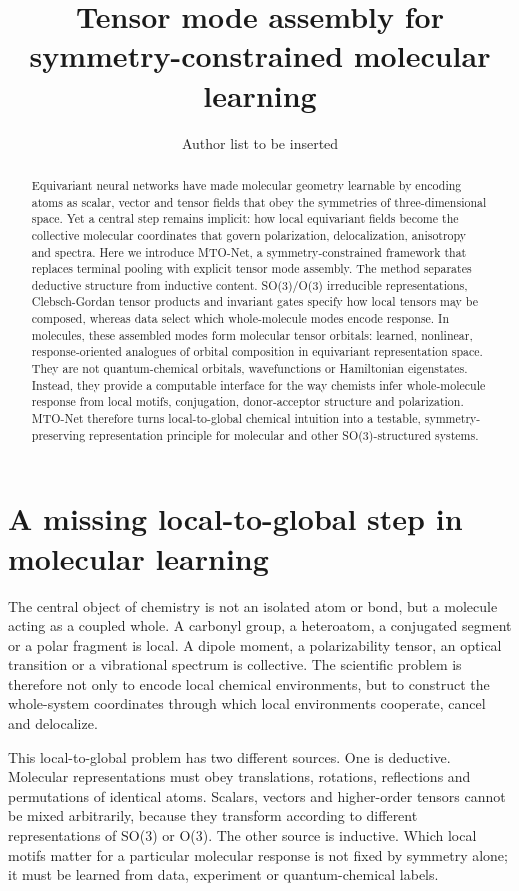 \documentclass[11pt]{article}
\title{\bfseries Tensor mode assembly for symmetry-constrained molecular learning}
\author{Author list to be inserted}
\date{}
\begin{document}
\maketitle

\begin{abstract}
Equivariant neural networks have made molecular geometry learnable by encoding atoms as scalar, vector and tensor fields that obey the symmetries of three-dimensional space. Yet a central step remains implicit: how local equivariant fields become the collective molecular coordinates that govern polarization, delocalization, anisotropy and spectra. Here we introduce MTO-Net, a symmetry-constrained framework that replaces terminal pooling with explicit tensor mode assembly. The method separates deductive structure from inductive content. SO(3)/O(3) irreducible representations, Clebsch-Gordan tensor products and invariant gates specify how local tensors may be composed, whereas data select which whole-molecule modes encode response. In molecules, these assembled modes form molecular tensor orbitals: learned, nonlinear, response-oriented analogues of orbital composition in equivariant representation space. They are not quantum-chemical orbitals, wavefunctions or Hamiltonian eigenstates. Instead, they provide a computable interface for the way chemists infer whole-molecule response from local motifs, conjugation, donor-acceptor structure and polarization. MTO-Net therefore turns local-to-global chemical intuition into a testable, symmetry-preserving representation principle for molecular and other SO(3)-structured systems.
\end{abstract}

\section*{A missing local-to-global step in molecular learning}

The central object of chemistry is not an isolated atom or bond, but a molecule acting as a coupled whole. A carbonyl group, a heteroatom, a conjugated segment or a polar fragment is local. A dipole moment, a polarizability tensor, an optical transition or a vibrational spectrum is collective. The scientific problem is therefore not only to encode local chemical environments, but to construct the whole-system coordinates through which local environments cooperate, cancel and delocalize.

This local-to-global problem has two different sources. One is deductive. Molecular representations must obey translations, rotations, reflections and permutations of identical atoms. Scalars, vectors and higher-order tensors cannot be mixed arbitrarily, because they transform according to different representations of SO(3) or O(3). The other source is inductive. Which local motifs matter for a particular molecular response is not fixed by symmetry alone; it must be learned from data, experiment or quantum-chemical labels.
\end{document}
